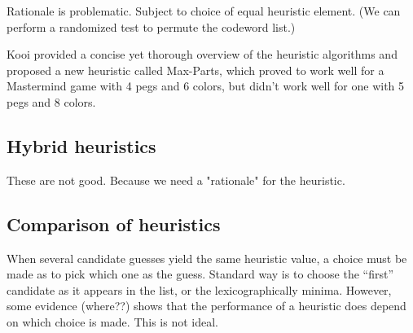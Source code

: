 Rationale is problematic. Subject to choice of equal heuristic element. (We can perform a randomized test to permute the codeword list.)

Kooi \cite{kooi05} provided a concise yet thorough overview of the heuristic algorithms and proposed a new heuristic called Max-Parts, which proved to work well for a Mastermind game with 4 pegs and 6 colors, but didn't work well for one with 5 pegs and 8 colors.


\subsection{Hybrid heuristics}




These are not good. Because we need a "rationale" for the heuristic. 

\subsection{Comparison of heuristics}

When several candidate guesses yield the same heuristic value, a choice must be made as to pick which one as the guess. Standard way is to choose the ``first'' candidate as it appears in the list, or the lexicographically minima. However, some evidence (where??) shows that the performance of a heuristic does depend on which choice is made. This is not ideal.


























